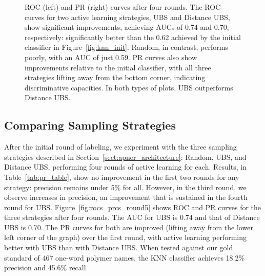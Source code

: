 \begin{figure}
\caption{ROC (left) and PR (right) curves after four rounds. 
The ROC curves for two active learning strategies, UBS and Distance UBS, show significant improvements,
achieving AUCs of 0.74 and 0.70, respectively: significantly better than the 0.62 achieved by the initial
classifier in Figure~\ref{fig:knn_init}. 
Random, in contrast, performs poorly, with an AUC of just 0.59.
PR curves also show improvements relative to the initial classifier, with all three strategies
lifting away from the bottom corner, indicating discriminative capacities.
In both types of plots, UBS outperforms Distance UBS. %
}\label{fig:rocs_prcs_round5}\label{fig:prcs_round5}
\end{figure}

\subsection{Comparing Sampling Strategies}
After the initial round of labeling, we experiment with the three sampling strategies described in Section~\ref{sect:apner_architecture}: Random, UBS, and Distance UBS,
performing four rounds of active learning for each.
Results, in Table~\ref{tab:pr_table}, show
no improvement in the first two rounds for any strategy: %
precision remains under 5\% for all.
However, in the third round, we observe increases in precision,
an improvement that  
is sustained in the fourth round for UBS.
Figure~\ref{fig:rocs_prcs_round5} shows ROC and PR curves for the three strategies after four rounds. 
The AUC for UBS is 0.74 and that of Distance UBS is 0.70. 
The PR curves for both are improved (lifting away from the lower left corner of the graph) over the first round, 
with active learning performing better with UBS than with Distance UBS.
When tested against our gold standard of 467 one-word polymer names, 
the KNN classifier achieves 18.2\% precision and  45.6\% recall. 

